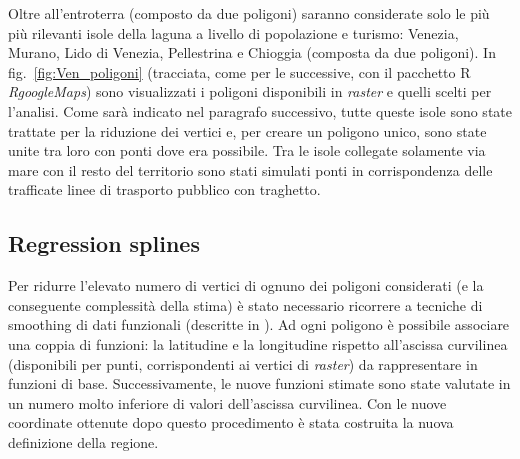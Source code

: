 \documentclass[a4paper,11pt,twoside,openright]{book}							%
\begin{document}
Oltre all'entroterra (composto da due poligoni) saranno considerate solo le più più rilevanti isole della laguna a livello di popolazione e turismo: Venezia, Murano, Lido di Venezia, Pellestrina e Chioggia (composta da due poligoni). In fig.~\ref{fig:Ven_poligoni} (tracciata, come per le successive, con il pacchetto R \textit{RgoogleMaps}) sono visualizzati i poligoni disponibili in \textit{raster} e quelli scelti per l'analisi. Come sarà indicato nel paragrafo successivo, tutte queste isole sono state trattate per la riduzione dei vertici e, per creare un poligono unico, sono state unite tra loro con ponti dove era possibile. Tra le isole collegate solamente via mare con il resto del territorio sono stati simulati ponti in corrispondenza delle trafficate linee di trasporto pubblico con traghetto. 

\subsection{Regression splines}

Per ridurre l'elevato numero di vertici di ognuno dei poligoni considerati (e la conseguente complessità della stima) è stato necessario ricorrere a tecniche di smoothing di dati funzionali (descritte in \cite{art:ramsaysilverman}). Ad ogni poligono è possibile associare una coppia di funzioni: la latitudine e la longitudine rispetto all'ascissa curvilinea (disponibili per punti, corrispondenti ai vertici di \textit{raster}) da rappresentare in funzioni di base. Successivamente, le nuove funzioni stimate sono state valutate in un numero molto inferiore di valori dell'ascissa curvilinea. Con le nuove coordinate ottenute dopo questo procedimento è stata costruita la nuova definizione della regione.
\end{document}
